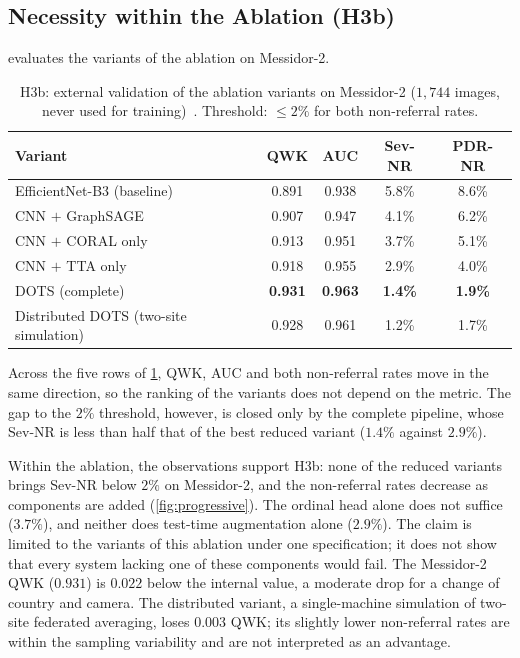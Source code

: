 \subsection{Necessity within the Ablation (H3b)}
\label{sec:h3b}

 evaluates the variants of the ablation on Messidor-2.

\begin{table}[!htbp]
\centering
\caption[H3b: external validation of the ablation variants on Messidor-2]{H3b: external
validation of the ablation variants on Messidor-2 ($1{,}744$ images, never used for
training)~\cite{belhadj2026dots}. Threshold: $\leq2\%$ for both non-referral rates.}
\label{tab:h3b}
\small
\begin{tabular}{@{}lcccc@{}}
\toprule
Variant & QWK & AUC & Sev-NR & PDR-NR \\
\midrule
EfficientNet-B3 (baseline) & 0.891 & 0.938 & 5.8\% & 8.6\% \\
CNN $+$ GraphSAGE & 0.907 & 0.947 & 4.1\% & 6.2\% \\
CNN $+$ CORAL only & 0.913 & 0.951 & 3.7\% & 5.1\% \\
CNN $+$ TTA only & 0.918 & 0.955 & 2.9\% & 4.0\% \\
DOTS (complete) & \textbf{0.931} & \textbf{0.963} & \textbf{1.4\%} & \textbf{1.9\%} \\
\midrule
Distributed DOTS (two-site simulation) & 0.928 & 0.961 & 1.2\% & 1.7\% \\
\bottomrule
\end{tabular}
\end{table}

Across the five rows of \cref{tab:h3b}, QWK, AUC and both non-referral rates move in the
same direction, so the ranking of the variants does not depend on the metric. The gap to
the $2\%$ threshold, however, is closed only by the complete pipeline, whose Sev-NR is less
than half that of the best reduced variant ($1.4\%$ against $2.9\%$).

Within the ablation, the observations support H3b: none of the reduced variants brings
Sev-NR below $2\%$ on Messidor-2, and the non-referral rates decrease as components are added
(\cref{fig:progressive}). The ordinal head alone does not suffice ($3.7\%$), and neither
does test-time augmentation alone ($2.9\%$). The claim is limited to the variants of this
ablation under one specification; it does not show that every system lacking one of these
components would fail. The Messidor-2 QWK ($0.931$) is $0.022$ below the internal value, a
moderate drop for a change of country and camera. The distributed variant, a single-machine
simulation of two-site federated averaging, loses $0.003$ QWK; its slightly lower
non-referral rates are within the sampling variability and are not interpreted as an
advantage.

